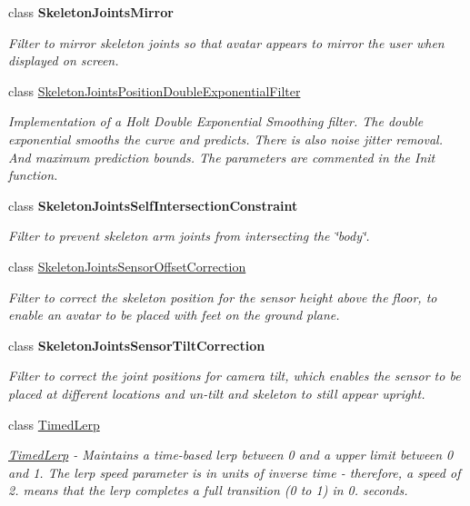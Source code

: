 \begin{DoxyCompactItemize}
class {\bfseries Skeleton\+Joints\+Mirror}
\begin{DoxyCompactList}\small\item\em Filter to mirror skeleton joints so that avatar appears to mirror the user when displayed on screen. \end{DoxyCompactList}\item 
class \hyperlink{class_microsoft_1_1_samples_1_1_kinect_1_1_avateering_1_1_filters_1_1_skeleton_joints_position_double_exponential_filter}{Skeleton\+Joints\+Position\+Double\+Exponential\+Filter}
\begin{DoxyCompactList}\small\item\em Implementation of a Holt Double Exponential Smoothing filter. The double exponential smooths the curve and predicts. There is also noise jitter removal. And maximum prediction bounds. The parameters are commented in the Init function. \end{DoxyCompactList}\item 
class {\bfseries Skeleton\+Joints\+Self\+Intersection\+Constraint}
\begin{DoxyCompactList}\small\item\em Filter to prevent skeleton arm joints from intersecting the \char`\"{}body\char`\"{}. \end{DoxyCompactList}\item 
class \hyperlink{class_microsoft_1_1_samples_1_1_kinect_1_1_avateering_1_1_filters_1_1_skeleton_joints_sensor_offset_correction}{Skeleton\+Joints\+Sensor\+Offset\+Correction}
\begin{DoxyCompactList}\small\item\em Filter to correct the skeleton position for the sensor height above the floor, to enable an avatar to be placed with feet on the ground plane. \end{DoxyCompactList}\item 
class {\bfseries Skeleton\+Joints\+Sensor\+Tilt\+Correction}
\begin{DoxyCompactList}\small\item\em Filter to correct the joint positions for camera tilt, which enables the sensor to be placed at different locations and un-\/tilt and skeleton to still appear upright. \end{DoxyCompactList}\item 
class \hyperlink{class_microsoft_1_1_samples_1_1_kinect_1_1_avateering_1_1_filters_1_1_timed_lerp}{Timed\+Lerp}
\begin{DoxyCompactList}\small\item\em \hyperlink{class_microsoft_1_1_samples_1_1_kinect_1_1_avateering_1_1_filters_1_1_timed_lerp}{Timed\+Lerp} -\/ Maintains a time-\/based lerp between 0 and a upper limit between 0 and 1. The lerp speed parameter is in units of inverse time -\/ therefore, a speed of 2. means that the lerp completes a full transition (0 to 1) in 0. seconds. \end{DoxyCompactList}\item 

\end{DoxyCompactItemize}
